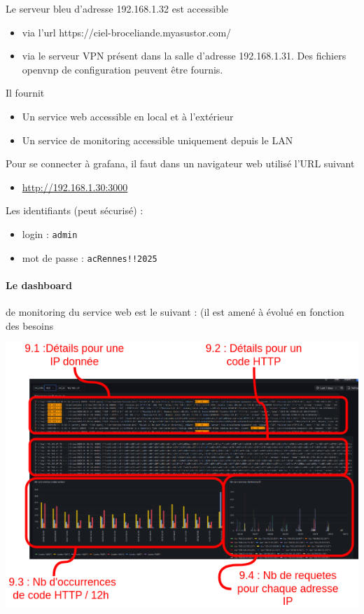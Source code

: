 \documentclass[french, 12pt]{article}%
\newcommand{\itemE}{\item[$\bullet$]}
\begin{document}
Le serveur bleu d'adresse 192.168.1.32 est accessible 
\begin{itemize}
\itemE via l'url https://ciel-broceliande.myasustor.com/
\itemE via le serveur VPN présent dans la salle d'adresse 192.168.1.31. Des fichiers openvnp de configuration peuvent être fournis.
\end{itemize}
Il fournit 
\begin{itemize}
\itemE Un service web accessible en local et à l'extérieur 
\itemE Un service de monitoring accessible uniquement depuis le LAN
\end{itemize}

\vspace{0.25cm}
Pour se connecter à grafana, il faut dans un navigateur web utilisé l'URL suivant  
\begin{itemize}
\itemE \url{http://192.168.1.30:3000}
\end{itemize}


\vspace{0.25cm}
Les identifiants (peut sécurisé) : 
\begin{itemize}
\itemE login : \verb?admin?
\itemE mot de passe : \verb?acRennes!!2025?
\end{itemize}

\paragraph{Le dashboard} de monitoring du service web est le suivant : (il est amené à évolué en fonction des besoins

\begin{center}
\includegraphics[scale=0.7]{./ressource/exempleRelle.drawio.png}
\end{center}
\end{document}
